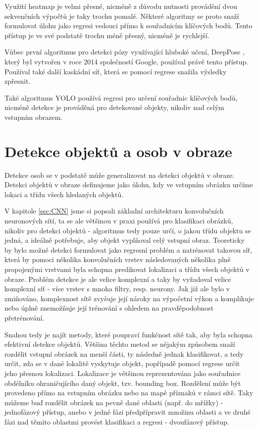 Využití heatmap je velmi přesné, nicméně z důvodu nutnosti provádění dvou
sekvenčních výpočtů je taky trochu pomalé. Některé algoritmy se proto snaží
formulovat úlohu jako regresi vedouci přímo k souřadnicím klíčových bodů. Tento
přístup je ve své podstatě trochu méně přesný, nicméně je rychlejší.

Vůbec první algoritmus pro detekci pózy využívající hluboké učení, DeepPose \cite{deep-pose}, který byl
vytvořen v roce 2014 společností Google, používal právě tento přístup. Používal
také další kaskádní síť, která se pomocí regrese snažila výsledky zpřesnit. 

Také algoritmus YOLO používá regresi pro určení souřadnic klíčových bodů,
nicméně detekce je prováděná pro detekované objekty, nikoliv nad celým vstupním
obrazem. \cite{yolo-pose}


\section{Detekce objektů a osob v obraze}

Detekce osob se v podstatě může generalizovat na detekci objektů v obraze.
Detekci objektů v obraze definujeme jako úlohu, kdy ve vstupním obrázku určíme
lokaci a třídu všech hledaných objektů.

V kapitole \ref{sec:CNN} jsme si popsali základní architekturu konvolučních
neuronových sítí, ta se ale většinou v praxi používá pro klasifikaci obrázků,
nikoliv pro detekci objektů - algoritmus tedy pouze určí, o jakou třídu objektu
se jedná, a ideálně potřebuje, aby objekt vyplňoval celý vstupní obraz.
Teoreticky by bylo možné detekci formulovat jako regresní problém a natrénovat
takovou síť, která by pomoci několika konvolučních vrstev následovaných
několika plně propojenými vrstvami byla schopna predikovat lokalizaci a třídu
všech objektů v obraze. \cite{szegedy} Problém detekce je ale velice komplexní
a taky by vyžadoval velice komplexní síť - více vrstev s mnoha filtry, resp.
neurony. Jak již ale bylo v zmiňováno, komplexnost sítě zvyšuje její nároky na
výpočetní výkon a komplikuje nebo úplně znemožňuje její trénování s ohledem na
pravděpodobnost přetrénování.

Snahou tedy je najít metody, které poupraví funkčnost sítě tak, aby byla
schopna efektivní detekce objektů. Většina těchto metod se nějakým způsobem
snaží rozdělit vstupní obrázek na menší části, ty následně jednak klasifikovat,
a tedy určit, zda se v dané lokalitě vyskytuje objekt, popřípadě pomocí regrese
určit jeho přesnou lokalizaci. Lokalizace je většinou reprezentována jako
souřadnice obdélníku ohraničujícího daný objekt, tzv. bounding box. Rozdělení
může být provedeno přímo na vstupním obrázku nebo na mapě příznaků v rámci
sítě. Taky můžeme buď rozdělit obrázek na pevně dané oblasti (např. do mřížky)
- jednofázový přístup, anebo v jedné fázi předpřípravit množinu oblasti a ve
druhé fázi nad těmito oblastmi provést klasifikaci a regresi - dvoufázový
přístup.

